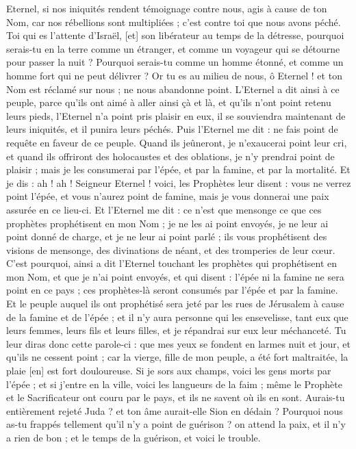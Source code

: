 \begin{multicols}{2}
Eternel, si nos iniquités rendent témoignage contre nous, agis à cause de ton Nom, car nos rébellions sont multipliées ; c'est contre toi que nous avons péché.
Toi qui es l'attente d'Israël, [et] son libérateur au temps de la détresse, pourquoi serais-tu en la terre comme un étranger, et comme un voyageur qui se détourne pour passer la nuit ?
Pourquoi serais-tu comme un homme étonné, et comme un homme fort qui ne peut délivrer ? Or tu es au milieu de nous, ô Eternel ! et ton Nom est réclamé sur nous ; ne nous abandonne point.
L'Eternel a dit ainsi à ce peuple, parce qu'ils ont aimé à aller ainsi çà et là, et qu'ils n'ont point retenu leurs pieds, l'Eternel n'a point pris plaisir en eux, il se souviendra maintenant de leurs iniquités, et il punira leurs péchés.
Puis l'Eternel me dit : ne fais point de requête en faveur de ce peuple.
Quand ils jeûneront, je n'exaucerai point leur cri, et quand ils offriront des holocaustes et des oblations, je n'y prendrai point de plaisir ; mais je les consumerai par l'épée, et par la famine, et par la mortalité.
Et je dis : ah ! ah ! Seigneur Eternel ! voici, les Prophètes leur disent : vous ne verrez point l'épée, et vous n'aurez point de famine, mais je vous donnerai une paix assurée en ce lieu-ci.
Et l'Eternel me dit : ce n'est que mensonge ce que ces prophètes prophétisent en mon Nom ; je ne les ai point envoyés, je ne leur ai point donné de charge, et je ne leur ai point parlé ; ils vous prophétisent des visions de mensonge, des divinations de néant, et des tromperies de leur cœur.
C'est pourquoi, ainsi a dit l'Eternel touchant les prophètes qui prophétisent en mon Nom, et que je n'ai point envoyés, et qui disent : l'épée ni la famine ne sera point en ce pays ; ces prophètes-là seront consumés par l'épée et par la famine.
Et le peuple auquel ils ont prophétisé sera jeté par les rues de Jérusalem à cause de la famine et de l'épée ; et il n'y aura personne qui les ensevelisse, tant eux que leurs femmes, leurs fils et leurs filles, et je répandrai sur eux leur méchanceté.
Tu leur diras donc cette parole-ci : que mes yeux se fondent en larmes nuit et jour, et qu'ils ne cessent point ; car la vierge, fille de mon peuple, a été fort maltraitée, la plaie [en] est fort douloureuse.
Si je sors aux champs, voici les gens morts par l'épée ; et si j'entre en la ville, voici les langueurs de la faim ; même le Prophète et le Sacrificateur ont couru par le pays, et ils ne savent où ils en sont.
Aurais-tu entièrement rejeté Juda ? et ton âme aurait-elle Sion en dédain ? Pourquoi nous as-tu frappés tellement qu'il n'y a point de guérison ? on attend la paix, et il n'y a rien de bon ; et le temps de la guérison, et voici le trouble.

\end{multicols}
